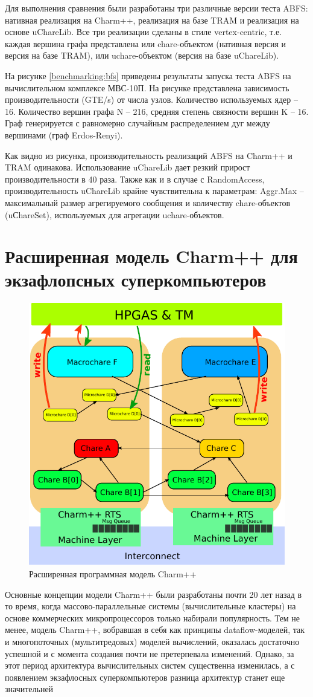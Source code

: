 \documentclass[11pt, oneside, a4paper]{article}
\begin{document}
Для выполнения сравнения были разработаны три различные версии теста ABFS: нативная реализация на Charm++, реализация на базе TRAM
и реализация на основе uChareLib. Все три реализации сделаны в стиле vertex-centric, т.е. каждая вершина графа представлена или 
chare-объектом (нативная версия и версия на базе TRAM), или uchare-объектом (версия на базе uChareLib).

На рисунке \ref{benchmarking:bfs} приведены результаты запуска теста ABFS на вычислительном комплексе МВС-10П. На рисунке представлена 
зависимость производительности (GTE/s) от числа узлов. Количество используемых ядер – 16. Количество вершин графа N – 216, средняя 
степень связности вершин K – 16. Граф генерируется с равномерно случайным распределением дуг между вершинами (граф Erdos-Renyi).

Как видно из рисунка, производительность реализаций ABFS на Charm++ и TRAM одинакова. Использование uChareLib дает резкий прирост производительности 
в 40 раза. Также как и в случае с RandomAccess, производительность uChareLib крайне чувствительна к параметрам: Aggr.Max – максимальный размер 
агрегируемого сообщения и количеству chare-объектов (uСhareSet), используемых для агрегации uchare-объектов.

\section{Расширенная модель Charm++ для экзафлопсных суперкомпьютеров}


\begin{figure}[!t]
\centering
	\includegraphics[width=0.5\linewidth]{img/charm-new-exec-model.pdf}
\caption{Расширенная программная модель Charm++}
\label{xcharm:model}
\end{figure}

Основные концепции модели Charm++ были разработаны почти 20 лет назад в то время, когда массово-параллельные системы (вычислительные кластеры) на основе коммерческих микропроцессоров только набирали популярность. Тем не менее, модель Charm++, вобравшая в себя как принципы dataflow-моделей, так и многопоточных (мультитредовых) моделей вычислений, оказалась достаточно успешной и с момента создания почти не претерпевала изменений. Однако, за этот период архитектура вычислительных систем существенна изменилась, а с появлением экзафлосных суперкомпьютеров разница архитектур станет еще значительней
\end{document}
